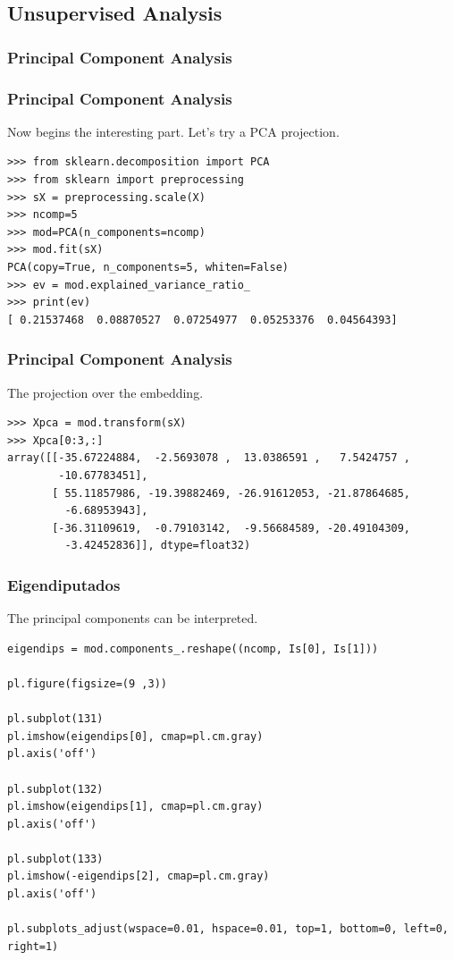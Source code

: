 \documentclass[10pt, colorlinks]{beamer}
\begin{document}
\subsection{Unsupervised Analysis}
\subsubsection{Principal Component Analysis}
\begin{frame}[fragile]\frametitle{Principal Component Analysis}
Now begins the interesting part. Let's try a PCA projection.
\begin{verbatim}
>>> from sklearn.decomposition import PCA
>>> from sklearn import preprocessing
>>> sX = preprocessing.scale(X)
>>> ncomp=5
>>> mod=PCA(n_components=ncomp)
>>> mod.fit(sX)
PCA(copy=True, n_components=5, whiten=False)
>>> ev = mod.explained_variance_ratio_
>>> print(ev)
[ 0.21537468  0.08870527  0.07254977  0.05253376  0.04564393]
\end{verbatim}

\end{frame}
\begin{frame}[fragile]\frametitle{Principal Component Analysis}
The projection over the embedding.
\begin{verbatim}
>>> Xpca = mod.transform(sX)
>>> Xpca[0:3,:]
array([[-35.67224884,  -2.5693078 ,  13.0386591 ,   7.5424757 ,
        -10.67783451],
       [ 55.11857986, -19.39882469, -26.91612053, -21.87864685,
         -6.68953943],
       [-36.31109619,  -0.79103142,  -9.56684589, -20.49104309,
         -3.42452836]], dtype=float32)
\end{verbatim}

\end{frame}
\begin{frame}[fragile]\frametitle{Eigendiputados}
The principal components can be interpreted.
\small
\begin{verbatim}
eigendips = mod.components_.reshape((ncomp, Is[0], Is[1]))

pl.figure(figsize=(9 ,3))

pl.subplot(131)
pl.imshow(eigendips[0], cmap=pl.cm.gray)
pl.axis('off')

pl.subplot(132)
pl.imshow(eigendips[1], cmap=pl.cm.gray)
pl.axis('off')

pl.subplot(133)
pl.imshow(-eigendips[2], cmap=pl.cm.gray)
pl.axis('off')

pl.subplots_adjust(wspace=0.01, hspace=0.01, top=1, bottom=0, left=0, right=1)
\end{verbatim}

\end{frame}
\end{document}

